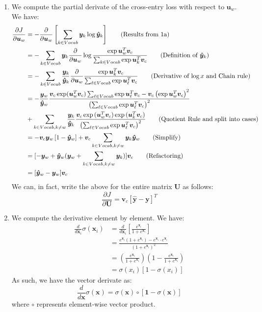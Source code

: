 \documentclass[12pt]{article}
\begin{document}
\begin{enumerate}[label=(\alph*)]
\item We compute the partial derivate of the cross-entry loss with respect to $\bm{u}_w$. We have:
\begin{align*}
 \frac{\partial J}{\partial \bm{u}_w} &= -\frac{\partial}{\partial \bm{u}_w} \left[ \sum_{k \in Vocab} \bm{y}_k \log \bm{\hat{y}}_k \right] \tag{Results from 1a} \\
&= -\sum_{k \in Vocab} \bm{y}_k \frac{\partial}{\partial \bm{u}_w} \log \frac{\exp{\bm{u}_w^T\bm{v}_c}}{\sum_{k \in Vocab} \exp{\bm{u}_k^T \bm{v}_c}} \tag{Definition of $\bm{\hat{y}}_k$} \\
&= -\sum_{k \in Vocab} \frac{\bm{y}_k}{\bm{\hat{y}}_k} \frac{\partial}{\partial \bm{u}_w} \frac{\exp{\bm{u}_k^T} \bm{v}_c}{\sum_{\ell \in Vocab} \exp{\bm{u}_{\ell}^T \bm{v}_c}} \tag{Derivative of $\log x$ and Chain rule} \\
&= -\frac{\bm{y}_w}{\bm{\hat{y}}_w} \frac{\bm{v}_c \exp(\bm{u}_w^T \bm{v}_c) \sum_{\ell \in Vocab} \exp \bm{u}_{\ell}^T \bm{v}_c - \bm{v}_c \left(\exp{\bm{u}_w^T \bm{v}_c}\right)^2 }{\left(\sum_{\ell \in Vocab} \exp \bm{u}_{\ell}^T \bm{v}_c \right)^2} \\
&+ \sum_{k \in Vocab, k \neq w} \frac{\bm{y}_k}{\bm{\hat{y}}_k}\frac{\bm{v}_c \exp{(\bm{u}_w^T \bm{v}_c)}\exp{(\bm{u}_k^T \bm{v}_c)}}{\left(\sum_{\ell \in Vocab} \exp{\bm{u}_{\ell}^T} \bm{v}_c \right)^2} \tag{Quotient Rule and split into cases} \\
&= -\bm{v}_c\bm{y}_w \left[1 - \bm{\hat{y}}_w \right] + \bm{v}_c \sum_{k \in Vocab, k \neq w} \bm{y}_k \bm{\hat{y}}_w \tag{Simplify} \\
&= [-\bm{y}_w + \bm{\hat{y}}_w(\bm{y}_w + \sum_{k \in Vocab, k \neq w} \bm{y}_k) ] \bm{v}_c \tag{Refactoring} \\
&= [\bm{\hat{y}}_w - \bm{y}_w]\bm{v}_c
\end{align*}
We can, in fact, write the above for the entire matrix $\bm{U}$ as follows:
$$
\frac{\partial J}{\partial \bm{U}} = \bm{v}_c[\bm{\hat{y}} - \bm{y}]^T
$$

\item We compute the derivative element by element. We have: 
\begin{align*}
\frac{d}{d\bm{x}_i} \sigma(\bm{x}_i) &= \frac{d}{d\bm{x}_i} \left[ \frac{e^{\bm{x}_i}}{1 + e^{\bm{x}_i}} \right] \\
&= \frac{e^{\bm{x}_i}(1 + e^{\bm{x}_i}) - e^{\bm{x}_i}\cdot e^{\bm{x}_i}}{(1 + e^{\bm{x}_i})^2} \\
&= \left(\frac{e^{\bm{x}_i}}{1 + e^{\bm{x}_i}}\right)\left(1 - \frac{e^{\bm{x}_i}}{1 + e^{\bm{x}_i}} \right) \\
&= \sigma(x_i)[1 - \sigma(x_i)]
\end{align*}
As such, we have the vector derivate as:
$$
\frac{d}{d \bm{x}} \sigma(\bm{x}) = \sigma(\bm{x}) \circ [\bm{1} - \sigma(\bm{x})]
$$
where $\circ$ represents element-wise vector product.


\end{enumerate}
\end{document}
